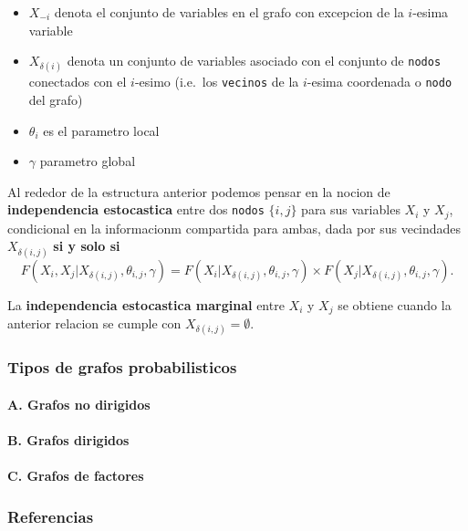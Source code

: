 \documentclass[11pt,]{article}
\begin{document}
\begin{itemize}
\item
  \(X_{-i}\) denota el conjunto de variables en el grafo con excepcion
  de la \(i\)-esima variable
\item
  \(X_{\delta(i)}\) denota un conjunto de variables asociado con el
  conjunto de \texttt{nodos} conectados con el \(i\)-esimo (i.e.~los
  \texttt{vecinos} de la \(i\)-esima coordenada o \texttt{nodo} del
  grafo)
\item
  \(\theta_i\) es el parametro local
\item
  \(\gamma\) parametro global
\end{itemize}

Al rededor de la estructura anterior podemos pensar en la nocion de
\textbf{independencia estocastica} entre dos \texttt{nodos} \(\{i,j\}\)
para sus variables \(X_i\) y \(X_j\), condicional en la informacionm
compartida para ambas, dada por sus vecindades \(X_{\delta(i,j)}\)
\textbf{si y solo si} \[F(X_i,X_j|X_{\delta(i,j)},\theta_{i,j},\gamma)
 =
 F(X_i|X_{\delta(i,j)},\theta_{i,j},\gamma)
 \times
 F(X_j|X_{\delta(i,j)},\theta_{i,j},\gamma).\]

La \textbf{independencia estocastica marginal} entre \(X_i\) y \(X_j\)
se obtiene cuando la anterior relacion se cumple con
\(X_{\delta(i,j)}=\emptyset\).

\subsubsection{Tipos de grafos
probabilisticos}\label{tipos-de-grafos-probabilisticos}

\paragraph{A. Grafos no dirigidos}\label{a.-grafos-no-dirigidos}

\paragraph{B. Grafos dirigidos}\label{b.-grafos-dirigidos}

\paragraph{C. Grafos de factores}\label{c.-grafos-de-factores}

\subsubsection{Referencias}\label{referencias}
\end{document}
